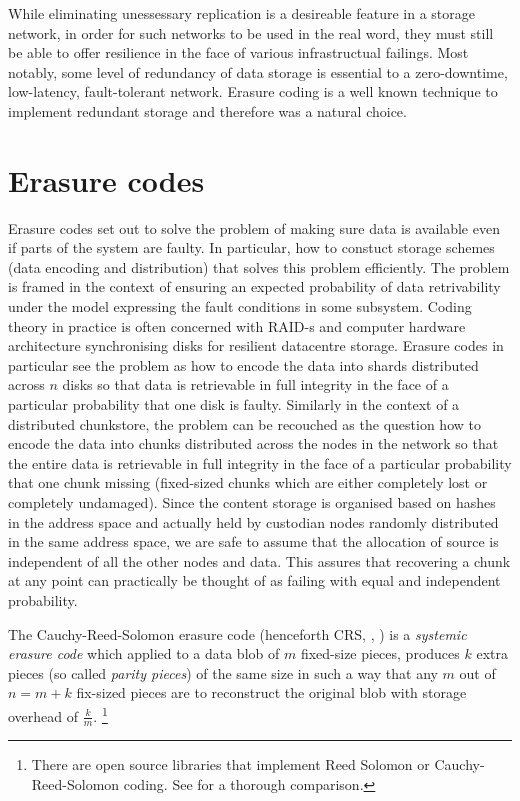 \documentclass[12pt]{article}
\begin{document}
While eliminating unessessary replication is a desireable feature in a storage network, in order for such networks to be used in the real word, they must still be able to offer resilience in the face of various infrastructual failings. Most notably, some level of redundancy of data storage is essential to a zero-downtime, low-latency, fault-tolerant network. Erasure coding is a well known technique to implement redundant storage and therefore was a natural choice.

\section{Erasure codes}

Erasure codes set out to solve the problem of making sure data is available even if parts of the system are faulty. In particular, how to constuct storage schemes (data encoding and distribution) that solves this problem efficiently.  The problem is framed in the context of ensuring an expected probability of data retrivability under the model expressing the fault conditions in some subsystem.
Coding theory in practice is often concerned with RAID-s and computer hardware architecture synchronising disks for resilient datacentre storage.
Erasure codes in particular see the problem as how to encode the data into shards distributed across $n$ disks so that data is retrievable in full integrity in the face of a particular probability that one disk is faulty.
Similarly in the context of a distributed chunkstore, the problem can be recouched as  the question how to encode the data into chunks distributed across the nodes in the network so that the entire data is retrievable in full integrity in the face of a particular probability that one chunk missing (fixed-sized chunks which are either completely lost or completely undamaged). Since the content storage is organised based on hashes in the address space
and actually held by custodian nodes randomly distributed in the same address space, we are safe to assume that the allocation of source is independent of all the other nodes and data. This assures that recovering a chunk at any point can practically be thought of as failing with equal and independent probability.


The Cauchy-Reed-Solomon erasure code (henceforth CRS, \cite{lubyetal1995CRS}, \cite{plank2006optimizing}) is a \emph{systemic erasure code} which applied to a data blob of $m$ fixed-size pieces, produces $k$ extra pieces (so called \emph{parity pieces}) of the same size in such a way that any $m$ out of $n=m+k$ fix-sized pieces are to reconstruct the original blob with storage overhead of $\frac{k}{m}$.%
%
\footnote{%
There are open source libraries that implement Reed Solomon or Cauchy-Reed-Solomon coding. See \cite{plank2009performance} for a thorough comparison.}
\end{document}
